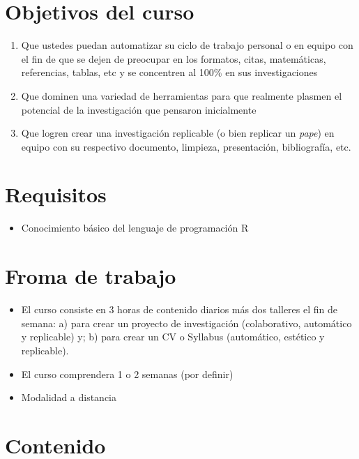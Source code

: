 \documentclass[11pt,]{article}
\providecommand{\tightlist}{%
  \setlength{\itemsep}{0pt}\setlength{\parskip}{0pt}}
\begin{document}
\hypertarget{objetivos-del-curso}{%
\section{Objetivos del curso}\label{objetivos-del-curso}}

\begin{enumerate}
\def\labelenumi{\arabic{enumi}.}
\item
  Que ustedes puedan automatizar su ciclo de trabajo personal o en
  equipo con el fin de que se dejen de preocupar en los formatos, citas,
  matemáticas, referencias, tablas, etc y se concentren al 100\% en sus
  investigaciones
\item
  Que dominen una variedad de herramientas para que realmente plasmen el
  potencial de la investigación que pensaron inicialmente
\item
  Que logren crear una investigación replicable (o bien replicar un
  \emph{pape}) en equipo con su respectivo documento, limpieza,
  presentación, bibliografía, etc.
\end{enumerate}

\hypertarget{requisitos}{%
\section{Requisitos}\label{requisitos}}

\begin{itemize}
\tightlist
\item
  Conocimiento básico del lenguaje de programación R
\end{itemize}

\hypertarget{froma-de-trabajo}{%
\section{Froma de trabajo}\label{froma-de-trabajo}}

\begin{itemize}
\item
  El curso consiste en 3 horas de contenido diarios más dos talleres el
  fin de semana: a) para crear un proyecto de investigación
  (colaborativo, automático y replicable) y; b) para crear un CV o
  Syllabus (automático, estético y replicable).
\item
  El curso comprendera 1 o 2 semanas (por definir)
\item
  Modalidad a distancia
\end{itemize}

\hypertarget{contenido}{%
\section{Contenido}\label{contenido}}
\end{document}
